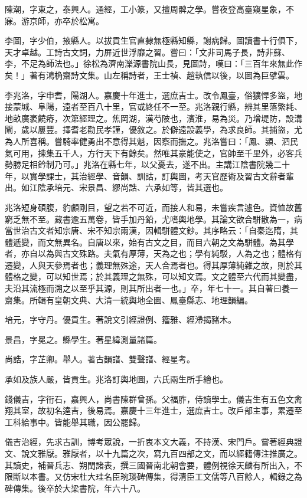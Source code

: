 \begin{pinyinscope}
陳潮，字東之，泰興人。通經，工小篆，又擅周髀之學。嘗夜登高臺窺星象，不寐。游京師，亦卒於松寓。

李圖，字少伯，掖縣人。以拔貢生官直隸無極縣知縣，謝病歸。圖讀書十行俱下，天才卓越。工詩古文詞，力屏近世浮靡之習。嘗曰：「文非司馬子長，詩非蘇、李，不足為師法也。」徐松為濟南濼源書院山長，見圖詩，嘆曰：「三百年來無此作矣！」著有鴻桷齋詩文集。山左稱詩者，王士禎、趙執信以後，以圖為巨擘雲。

李兆洛，字申耆，陽湖人。嘉慶十年進士，選庶吉士。改令鳳臺，俗獷悍多盜，地接蒙城、阜陽，遠者至百八十里，官或終任不一至。兆洛親行縣，辨其里落繁耗、地畝廣袤饒瘠，次第經理之。焦岡湖，漢芍陂也，濱淮，易為災。乃增堤防，設溝閘，歲以屢豐。擇耆老勸民孝謹，優敘之。於僻遠設義學，為求良師。其捕盜，尤為人所喜稱。嘗騎率健勇出不意得其魁，因察而撫之。兆洛嘗曰：「鳳、潁、泗民氣可用，揀集五千人，方行天下有餘矣。然唯其豪能使之，官帥至千里外，必客兵勢勝足相鈐制乃可。」兆洛在縣七年，以父憂去，遂不出。主講江陰書院幾二十年，以實學課士，其治經學、音韻、訓詁，訂輿圖，考天官歷術及習古文辭者輩出。如江陰承培元、宋景昌、繆尚誥、六承如等，皆其選也。

兆洛短身碩腹，豹顱剛目，望之若不可近，而接人和易，未嘗疾言遽色。資恤故舊窮乏無不至。藏書逾五萬卷，皆手加丹鉛，尤嗜輿地學。其論文欲合駢散為一，病當世治古文者知宗唐、宋不知宗兩漢，因輯駢體文鈔。其序略云：「自秦迄隋，其體遞變，而文無異名。自唐以來，始有古文之目，而目六朝之文為駢體。為其學者，亦自以為與古文殊路。夫氣有厚薄，天為之也；學有純駁，人為之也；體格有遷變，人與天參焉者也；義理無殊途，天人合焉者也。得其厚薄純雜之故，則於其體格之變，可以知世焉；於其義理之無殊，可以知文焉。文之體至六代而其變盡，夫沿其流極而溯之以至乎其源，則其所出者一也。」卒，年七十一。其自著曰養一齋集。所輯有皇朝文典、大清一統輿地全圖、鳳臺縣志、地理韻編。

培元，字守丹。優貢生。著說文引經證例、籀雅、經滯揭豬木。

景昌，字冕之。縣學生。著星緯測量諸篇。

尚誥，字芷卿。舉人。著古韻譜、雙聲譜、經星考。

承如及族人嚴，皆貢生。兆洛訂輿地圖，六氏兩生所手繪也。

錢儀吉，字衎石，嘉興人，尚書陳群曾孫。父福胙，侍讀學士。儀吉生有五色文禽翔其室，故初名逵吉，後易焉。嘉慶十三年進士，選庶吉士。改戶部主事，累遷至工科給事中。皆能舉其職，因公罷歸。

儀吉治經，先求古訓，博考眾說，一折衷本文大義，不持漢、宋門戶。嘗著經典證文、說文雅厭。雅厭者，以十九篇之次，寫九百四部之文，而以經籍傳注推廣之。其讀史，補晉兵志、朔閏諸表，撰三國晉南北朝會要，體例視徐天麟有所出入，不限斷以本書。又仿宋杜大珪名臣琬琰碑傳集，得清臣工文儒等八百餘人，輯錄之為碑傳集。後卒於大梁書院，年六十八。


\end{pinyinscope}
